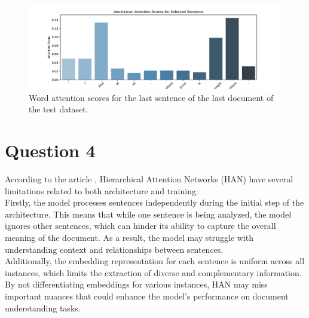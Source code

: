 \documentclass[a4paper]{article}
\begin{document}
\begin{figure}[H]
    \centering
    \includegraphics[width=.7\linewidth]{../figures/word_attention_scores.pdf}
    \caption{Word attention scores for the last sentence of the last document of the test dataset.}
    \label{word-scores}    
\end{figure}

\section*{Question 4}
\noindent
According to the article \cite{remy2019bidirectionalcontextawarehierarchicalattention}, Hierarchical Attention
Networks (HAN) have several limitations related to both architecture and training.
\\
Firstly, the model processes sentences independently during the initial step of the architecture. This means
that while one sentence is being analyzed, the model ignores other sentences, which can hinder its
ability to capture the overall meaning of the document. As a result, the model may struggle with
understanding context and relationships between sentences.
\\
Additionally, the embedding representation for each sentence is uniform across all instances, which
limits the extraction of diverse and complementary information. By not differentiating embeddings
for various instances, HAN may miss important nuances that could enhance the model's performance
on document understanding tasks.




\end{document}
